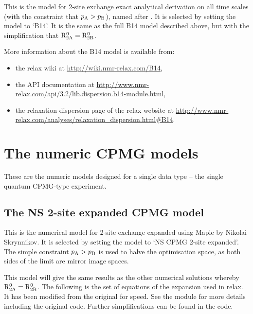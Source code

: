 This is the model for 2-site exchange exact analytical derivation on all time scales (with the constraint that $p_{\textrm{A}} > p_{\textrm{B}}$), named after \citet{Baldwin2014}.
It is selected by setting the model to `B14'.
It is the same as the full B14 model described above, but with the simplification that $\mathrm{R}_{\mathrm{2A}}^0 = \mathrm{R}_{\mathrm{2B}}^0$.

More information about the B14 model is available from:
\begin{itemize}
  \item the relax wiki at \url{http://wiki.nmr-relax.com/B14},
  \item the API documentation at \url{http://www.nmr-relax.com/api/3.2/lib.dispersion.b14-module.html},
  \item the relaxation dispersion page of the relax website at \url{http://www.nmr-relax.com/analyses/relaxation\_dispersion.html#B14}.
\end{itemize}



\section{The numeric CPMG models}
\label{sect: dispersion: numeric CPMG models}

These are the numeric models designed for a single data type -- the single quantum CPMG-type experiment.



\subsection{The NS 2-site expanded CPMG model}
\label{sect: dispersion: NS CPMG 2-site expanded model}

This is the numerical model for 2-site exchange expanded using Maple by Nikolai Skrynnikov.
It is selected by setting the model to `NS CPMG 2-site expanded'.
The simple constraint $p_{\textrm{A}} > p_{\textrm{B}}$ is used to halve the optimisation space, as both sides of the limit are mirror image spaces.

This model will give the same results as the other numerical solutions whereby $\mathrm{R}_{\mathrm{2A}}^0 = \mathrm{R}_{\mathrm{2B}}^0$.
The following is the set of equations of the expansion used in relax.
It has been modified from the original for speed.
See the  module for more details including the original code.
Further simplifications can be found in the code.

